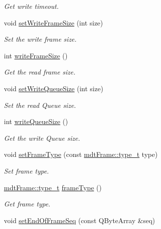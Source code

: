 \begin{DoxyCompactItemize}
\begin{DoxyCompactList}\small\item\em Get write timeout. \end{DoxyCompactList}\item 
void \hyperlink{classmdt_port_config_a9539cef9e33d564c7c70902a6380be04}{setWriteFrameSize} (int size)
\begin{DoxyCompactList}\small\item\em Set the write frame size. \end{DoxyCompactList}\item 
int \hyperlink{classmdt_port_config_a4ea423e825c0730ede17a55fb723c6ac}{writeFrameSize} ()
\begin{DoxyCompactList}\small\item\em Get the read frame size. \end{DoxyCompactList}\item 
void \hyperlink{classmdt_port_config_a8a99771f7acfeb546d1d89d3671407e5}{setWriteQueueSize} (int size)
\begin{DoxyCompactList}\small\item\em Set the read Queue size. \end{DoxyCompactList}\item 
int \hyperlink{classmdt_port_config_a476ae5e51401da1da4f01e40cc4441ab}{writeQueueSize} ()
\begin{DoxyCompactList}\small\item\em Get the write Queue size. \end{DoxyCompactList}\item 
void \hyperlink{classmdt_port_config_a627adcb87d26757238f844db19fc248d}{setFrameType} (const \hyperlink{classmdt_frame_af936e37d5fe4c066c0fb0161fafd4a17}{mdtFrame::type\_\-t} type)
\begin{DoxyCompactList}\small\item\em Set frame type. \end{DoxyCompactList}\item 
\hyperlink{classmdt_frame_af936e37d5fe4c066c0fb0161fafd4a17}{mdtFrame::type\_\-t} \hyperlink{classmdt_port_config_a547cb25cd2b1b0b3c40e7ebf023c7a1d}{frameType} ()
\begin{DoxyCompactList}\small\item\em Get frame type. \end{DoxyCompactList}\item 
\hypertarget{classmdt_port_config_a3c5e1c444a18da7d68430bd1c14030f4}{
void \hyperlink{classmdt_port_config_a3c5e1c444a18da7d68430bd1c14030f4}{setEndOfFrameSeq} (const QByteArray \&seq)}
\label{classmdt_port_config_a3c5e1c444a18da7d68430bd1c14030f4}


\end{DoxyCompactItemize}
